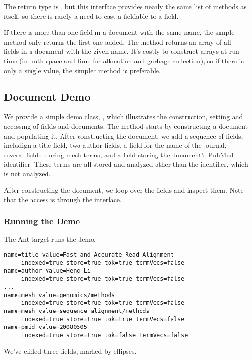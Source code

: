 The return type is , but this interface provides
nearly the same list of methods as  itself, so there is
rarely a need to cast a fieldable to a field.  

If there is more than one field in a document with the same name, the
simple method  only returns the first one
added.  The method  returns an array of
all fields in a document with the given name.  It's costly to
construct arrays at run time (in both space and time for allocation
and garbage collection), so if there is only a single value, the
simpler method is preferable.



\subsection{Document Demo}

We provide a simple demo class, , which illustrates
the construction, setting and accessing of fields and documents.
The  method starts by constructing a document and
populating it.
%
%
After constructing the document, we add a sequence of fields,
includign a title field, two author fields, a field for the name of
the journal, several fields storing mesh terms, and a field storing
the document's PubMed identifier.  These terms are all stored
and analyzed other than the identifier, which is not analyzed.

After constructing the document, we loop over the fields and
inspect them.
%
%
Note that the access is through the  interface.

\subsubsection{Running the Demo}

The Ant target  runs the demo.  
%
\begin{verbatim}
name=title value=Fast and Accurate Read Alignment
     indexed=true store=true tok=true termVecs=false
name=author value=Heng Li
     indexed=true store=true tok=true termVecs=false
...
name=mesh value=genomics/methods
     indexed=true store=true tok=true termVecs=false
name=mesh value=sequence alignment/methods
     indexed=true store=true tok=true termVecs=false
name=pmid value=20080505
     indexed=true store=true tok=false termVecs=false
\end{verbatim}
%
We've elided three fields, marked by ellipses.



